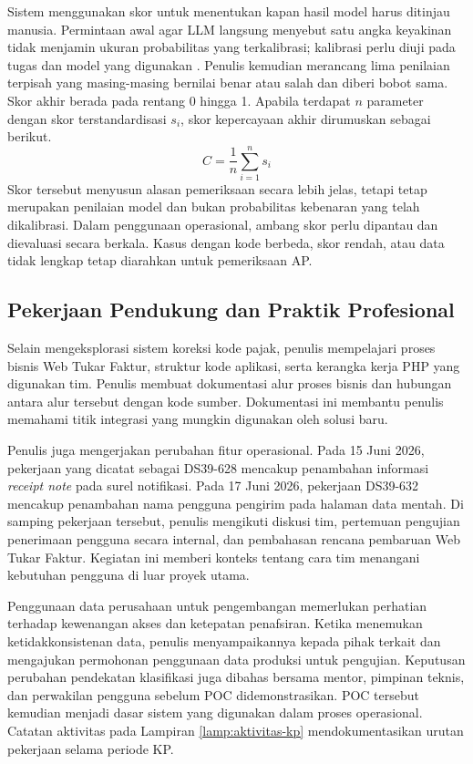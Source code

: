 Sistem menggunakan skor untuk menentukan kapan hasil model harus ditinjau manusia. Permintaan awal agar LLM langsung menyebut satu angka keyakinan tidak menjamin ukuran probabilitas yang terkalibrasi; kalibrasi perlu diuji pada tugas dan model yang digunakan \parencite{lin2022uncertainty}. Penulis kemudian merancang lima penilaian terpisah yang masing-masing bernilai benar atau salah dan diberi bobot sama. Skor akhir berada pada rentang 0 hingga 1.
Apabila terdapat \label{sym:n}$n$ parameter dengan skor terstandardisasi \label{sym:si}$s_i$, skor kepercayaan akhir dirumuskan sebagai berikut.
\begin{equation}
    C = \frac{1}{n} \sum_{i=1}^{n} s_i
    \label{eq:confidence-score}
\end{equation}
Skor tersebut menyusun alasan pemeriksaan secara lebih jelas, tetapi tetap merupakan penilaian model dan bukan probabilitas kebenaran yang telah dikalibrasi. Dalam penggunaan operasional, ambang skor perlu dipantau dan dievaluasi secara berkala. Kasus dengan kode berbeda, skor rendah, atau data tidak lengkap tetap diarahkan untuk pemeriksaan AP.

\subsection{Pekerjaan Pendukung dan Praktik Profesional}
\label{subsec:pekerjaan-pendukung}

Selain mengeksplorasi sistem koreksi kode pajak, penulis mempelajari proses bisnis Web Tukar Faktur, struktur kode aplikasi, serta kerangka kerja PHP yang digunakan tim. Penulis membuat dokumentasi alur proses bisnis dan hubungan antara alur tersebut dengan kode sumber. Dokumentasi ini membantu penulis memahami titik integrasi yang mungkin digunakan oleh solusi baru.

Penulis juga mengerjakan perubahan fitur operasional. Pada 15 Juni 2026, pekerjaan yang dicatat sebagai DS39-628 mencakup penambahan informasi \textit{receipt note} pada surel notifikasi. Pada 17 Juni 2026, pekerjaan DS39-632 mencakup penambahan nama pengguna pengirim pada halaman data mentah. Di samping pekerjaan tersebut, penulis mengikuti diskusi tim, pertemuan pengujian penerimaan pengguna secara internal, dan pembahasan rencana pembaruan Web Tukar Faktur. Kegiatan ini memberi konteks tentang cara tim menangani kebutuhan pengguna di luar proyek utama.

Penggunaan data perusahaan untuk pengembangan memerlukan perhatian terhadap kewenangan akses dan ketepatan penafsiran. Ketika menemukan ketidakkonsistenan data, penulis menyampaikannya kepada pihak terkait dan mengajukan permohonan penggunaan data produksi untuk pengujian. Keputusan perubahan pendekatan klasifikasi juga dibahas bersama mentor, pimpinan teknis, dan perwakilan pengguna sebelum POC didemonstrasikan. POC tersebut kemudian menjadi dasar sistem yang digunakan dalam proses operasional. Catatan aktivitas pada Lampiran \ref{lamp:aktivitas-kp} mendokumentasikan urutan pekerjaan selama periode KP.

